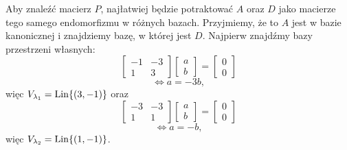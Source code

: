 \begin{solution}
    Aby znaleźć macierz $P$, najłatwiej będzie potraktować $A$ oraz $D$ jako macierze tego samego endomorfizmu w różnych bazach. Przyjmiemy, że to $A$ jest w bazie kanonicznej i znajdziemy bazę, w której jest $D$. Najpierw znajdźmy bazy przestrzeni własnych:
    \[ \begin{bmatrix}
        -1 & -3 \\
        1 & 3
    \end{bmatrix}\begin{bmatrix}
        a \\ b
    \end{bmatrix} = \begin{bmatrix}
        0 \\ 0
    \end{bmatrix} \]
    \[ \iff a = -3b, \]
    więc $V_{\lambda_1} = \operatorname{Lin}\{(3, -1)\}$ oraz
    \[ \begin{bmatrix}
        -3 & -3 \\
        1 & 1
    \end{bmatrix}\begin{bmatrix}
        a \\ b
    \end{bmatrix} = \begin{bmatrix}
        0 \\ 0
    \end{bmatrix} \]
    \[ \iff a = -b, \]
    więc $V_{\lambda_2} = \operatorname{Lin}\{(1, -1)\}$.


\end{solution}
